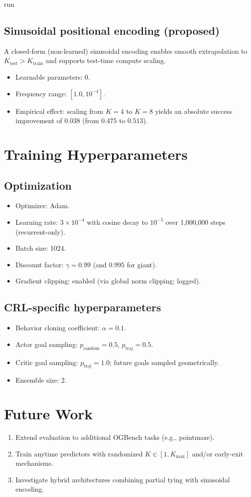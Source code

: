 run\documentclass[11pt]{article}
\begin{document}
\subsection{Sinusoidal positional encoding (proposed)}
A closed-form (non-learned) sinusoidal encoding enables smooth extrapolation to $K_{\text{test}} > K_{\text{train}}$ and supports test-time compute scaling.
\begin{itemize}
  \item Learnable parameters: 0.
  \item Frequency range: $[1.0, 10^{-4}]$.
  \item Empirical effect: scaling from $K=4$ to $K=8$ yields an absolute success improvement of $0.038$ (from $0.475$ to $0.513$).
\end{itemize}

\section{Training Hyperparameters}
\subsection{Optimization}
\begin{itemize}
  \item Optimizer: Adam.
  \item Learning rate: $3\times 10^{-4}$ with cosine decay to $10^{-5}$ over 1,000,000 steps (recurrent-only).
  \item Batch size: 1024.
  \item Discount factor: $\gamma=0.99$ (and $0.995$ for giant).
  \item Gradient clipping: enabled (via global norm clipping; logged).
\end{itemize}


\subsection{CRL-specific hyperparameters}
\begin{itemize}
  \item Behavior cloning coefficient: $\alpha=0.1$.
  \item Actor goal sampling: $p_{\text{random}}=0.5$, $p_{\text{traj}}=0.5$.
  \item Critic goal sampling: $p_{\text{traj}}=1.0$; future goals sampled geometrically.
  \item Ensemble size: 2.
\end{itemize}



\section{Future Work}
\begin{enumerate}
  \item Extend evaluation to additional OGBench tasks (e.g., pointmaze).
  \item Train anytime predictors with randomized $K \in [1, K_{\max}]$ and/or early-exit mechanisms.
  \item Investigate hybrid architectures combining partial tying with sinusoidal encoding.
\end{enumerate}
\end{document}
